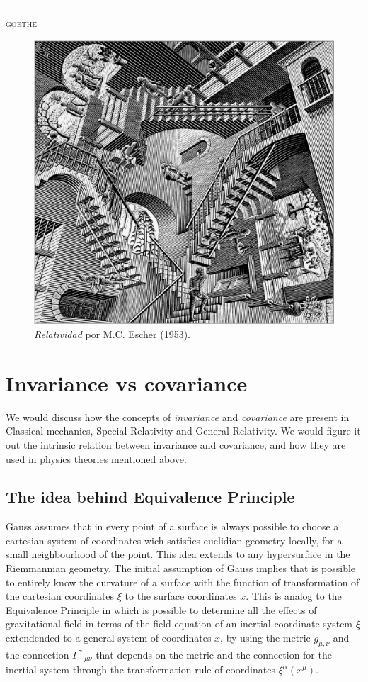 \documentclass[11pt, letterpaper]{article}
\begin{document}
\rule{\linewidth}{0.4pt}
\begin{flushright}
\textsc{goethe}
\end{flushright}
\vfill
\begin{figure}[ht]
	\centering
	\includegraphics[width = 0.8\linewidth]{images/relatividad_escher.jpg}
	\caption{\textit{Relatividad} por M.C. Escher (1953).}
\end{figure}
\vfill

\newpage
\section{Invariance vs covariance}
We would discuss how the concepts of \textit{invariance} and \textit{covariance} are present in Classical mechanics, Special Relativity and General Relativity. We would figure it out the intrinsic relation between invariance and covariance, and how they are used in physics theories mentioned above.

\subsection*{The idea behind Equivalence Principle}
Gauss assumes that in every point of a surface is always possible to choose a cartesian system of coordinates wich satisfies euclidian geometry locally, for a small neighbourhood of the point. This idea extends to any hypersurface in the Riemmannian geometry. The initial assumption of Gauss implies that is possible to entirely know the curvature of a surface with the function of transformation of the cartesian coordinates $\xi$ to the surface coordinates $x$. This is analog to the Equivalence Principle in which is possible to determine all the effects of gravitational field in terms of the field equation of an inertial coordinate system $\xi$ extendended to a general system of coordinates $x$, by using the metric  $g_{\mu,\nu}$ and the connection $\Gamma^{\gamma}\,_{\mu \nu}$ that depends on the metric and the connection for the inertial system through the transformation rule of coordinates $\xi^\alpha(x^\mu)$.
\end{document}

